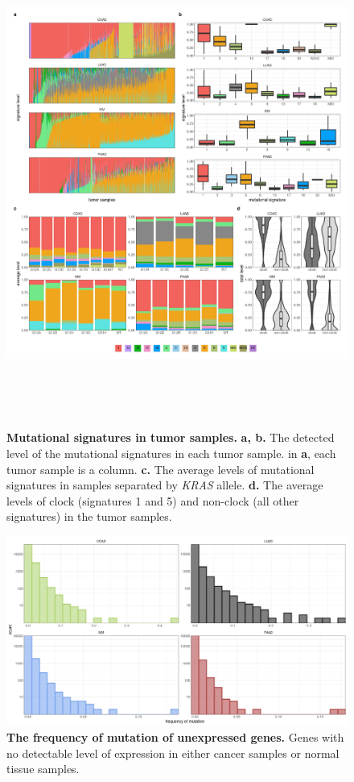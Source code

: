 \documentclass[english, 12pt, letterpaper]{article}
\newcommand{\KRAS}{\emph{KRAS}}
\begin{document}
\begin{figure}[p]
\centering
\includegraphics[height=160mm]{figures/SuppFigure_02.jpeg}
\caption{
    \textbf{Mutational signatures in tumor samples.}
    \textbf{a, b.} The detected level of the mutational signatures in each tumor sample. in \textbf{a}, each tumor sample is a column.
    \textbf{c.} The average levels of mutational signatures in samples separated by \KRAS{} allele.
    \textbf{d.} The average levels of clock (signatures 1 and 5) and non-clock (all other signatures) in the tumor samples.
}
\label{sfig:mutational-signatures-summary}
\end{figure}


\begin{figure}[p]
\centering
\includegraphics[width=\textwidth]{figures/SuppFigure_03.jpeg}
\caption{
    \textbf{The frequency of mutation of unexpressed genes.} Genes with no detectable level of expression in either cancer samples or normal tissue samples.
}
\label{sfig:mutfreq-of-unexpressed-genes}
\end{figure}
\end{document}
